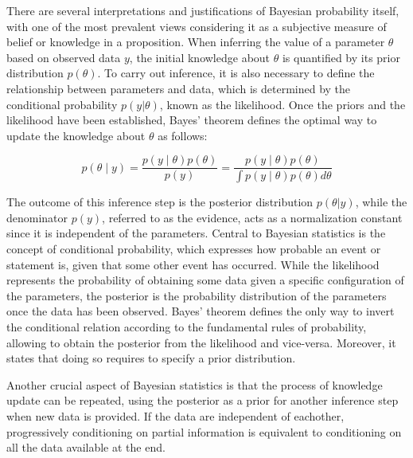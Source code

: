 There are several interpretations and justifications of Bayesian probability itself, with one of the most prevalent views considering it as a subjective measure of belief or knowledge in a proposition.  When inferring the value of a parameter $\theta$ based on observed data $y$, the initial knowledge about $\theta$ is quantified by its prior distribution $p(\theta)$. To carry out inference, it is also necessary to define the relationship between parameters and data, which is determined by the conditional probability $p(y|\theta)$, known as the likelihood. Once the priors and the likelihood have been established, Bayes' theorem defines the optimal way to update the knowledge about $\theta$ as follows:

\begin{equation}
p(\theta\mid y)= \frac{p(y\mid\theta)p(\theta)}{p(y)} = \frac{p(y\mid\theta)p(\theta)}{\int p(y\mid\theta)p(\theta)d\theta}
\end{equation}

The outcome of this inference step is the posterior distribution $p(\theta|y)$, while the denominator $p(y)$, referred
to as the evidence, acts as a normalization constant since it is independent of the parameters.
Central to Bayesian statistics is the concept of conditional probability, which expresses how probable an event or
statement is, given that some other event has occurred. While the likelihood represents the
probability of
obtaining some data given a specific configuration of the parameters, the posterior is the probability distribution of
the parameters once the data has been observed. Bayes' theorem defines the only way to invert the conditional relation according to the fundamental rules of
probability, allowing to obtain the posterior from the likelihood and vice-versa. Moreover, it states that doing so
requires to specify a prior distribution.


Another crucial aspect of Bayesian statistics is that the process of knowledge update can be repeated, using the
posterior as a prior for another inference step when new data is provided. If the data are independent of eachother,
progressively conditioning on partial information is equivalent to conditioning on all the
data available at the end.

